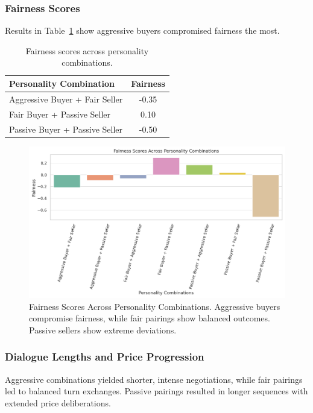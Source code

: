 \documentclass[11pt]{article}
\begin{document}
\subsubsection{Fairness Scores}
Results in Table~\ref{tab:fairness_scores} show aggressive buyers compromised fairness the most.

\begin{table}[h!]
\centering
\begin{tabular}{l|c}
\hline
\textbf{Personality Combination} & \textbf{Fairness} \\
\hline
Aggressive Buyer + Fair Seller   & -0.35 \\
Fair Buyer + Passive Seller      & 0.10  \\
Passive Buyer + Passive Seller   & -0.50 \\
\hline
\end{tabular}
\caption{Fairness scores across personality combinations.}
\label{tab:fairness_scores}
\end{table}

\begin{figure}[h]
    \centering
    \includegraphics[width=1\linewidth]{figures/personality/fairness_scores.png}
    \caption{Fairness Scores Across Personality Combinations. Aggressive buyers compromise fairness, while fair pairings show balanced outcomes. Passive sellers show extreme deviations.}
    \label{fig:fairness_scores}
\end{figure}

\subsubsection{Dialogue Lengths and Price Progression}
Aggressive combinations yielded shorter, intense negotiations, while fair pairings led to balanced turn exchanges. Passive pairings resulted in longer sequences with extended price deliberations.
\end{document}
